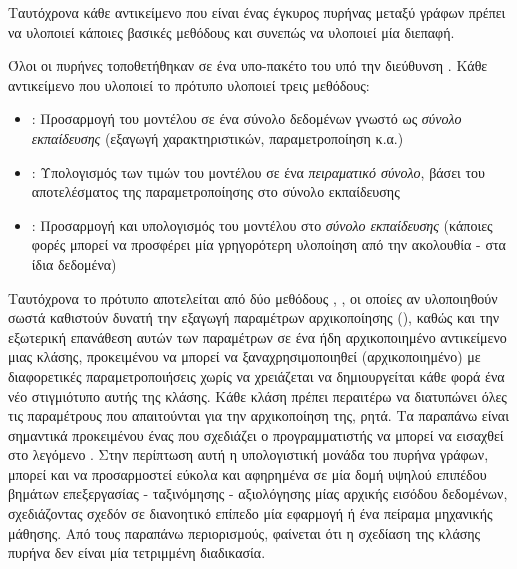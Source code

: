 Ταυτόχρονα κάθε αντικείμενο που είναι ένας έγκυρος πυρήνας μεταξύ γράφων πρέπει να υλοποιεί κάποιες βασικές μεθόδους και συνεπώς να υλοποιεί μία διεπαφή.\par
Όλοι οι πυρήνες τοποθετήθηκαν σε ένα υπο-πακέτο του  υπό την διεύθυνση .
Κάθε αντικείμενο που υλοποιεί το πρότυπο  υλοποιεί τρεις μεθόδους:
  \begin{itemize}
    \item \texttt{}: Προσαρμογή του μοντέλου σε ένα σύνολο δεδομένων γνωστό ως \textit{σύνολο εκπαίδευσης} (εξαγωγή χαρακτηριστικών, παραμετροποίηση κ.α.)
    \item \texttt{}: Υπολογισμός των τιμών του μοντέλου σε ένα \textit{πειραματικό σύνολο}, βάσει του αποτελέσματος της παραμετροποίησης στο σύνολο εκπαίδευσης
    \item \texttt{}: Προσαρμογή και υπολογισμός του μοντέλου στο \textit{σύνολο εκπαίδευσης} (κάποιες φορές μπορεί να προσφέρει μία γρηγορότερη υλοποίηση από την ακολουθία \texttt{} - \texttt{} στα ίδια δεδομένα)
\end{itemize}
Ταυτόχρονα το πρότυπο  αποτελείται από δύο μεθόδους \texttt{}, \texttt{}, οι οποίες αν υλοποιηθούν σωστά καθιστούν δυνατή την εξαγωγή παραμέτρων αρχικοποίησης (), καθώς και την εξωτερική επανάθεση αυτών των παραμέτρων σε ένα ήδη αρχικοποιημένο αντικείμενο μιας κλάσης, προκειμένου να μπορεί να ξαναχρησιμοποιηθεί (αρχικοποιημένο) με διαφορετικές παραμετροποιήσεις χωρίς να χρειάζεται να δημιουργείται κάθε φορά ένα νέο στιγμιότυπο αυτής της κλάσης.
Κάθε κλάση πρέπει περαιτέρω να διατυπώνει όλες τις παραμέτρους που απαιτούνται για την αρχικοποίηση της, ρητά.
Τα παραπάνω είναι σημαντικά προκειμένου ένας  που σχεδιάζει ο προγραμματιστής να μπορεί να εισαχθεί στο λεγόμενο .
Στην περίπτωση αυτή η υπολογιστική μονάδα του πυρήνα γράφων, μπορεί και να προσαρμοστεί εύκολα και αφηρημένα σε μία δομή υψηλού επιπέδου βημάτων επεξεργασίας - ταξινόμησης - αξιολόγησης μίας αρχικής εισόδου δεδομένων, σχεδιάζοντας σχεδόν σε διανοητικό επίπεδο μία εφαρμογή ή ένα πείραμα μηχανικής μάθησης.
Από τους παραπάνω περιορισμούς, φαίνεται ότι η σχεδίαση της κλάσης πυρήνα δεν είναι μία τετριμμένη διαδικασία.
